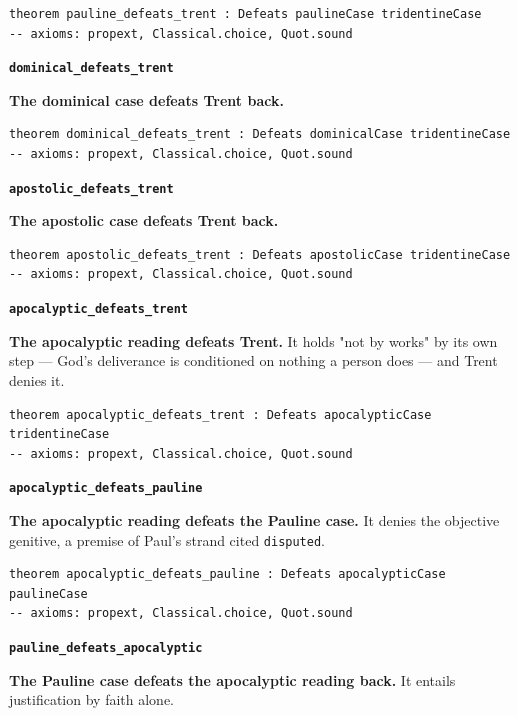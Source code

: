 \documentclass[11pt]{article}
\begin{document}
{\small\begin{verbatim}
theorem pauline_defeats_trent : Defeats paulineCase tridentineCase
-- axioms: propext, Classical.choice, Quot.sound
\end{verbatim}}
\par\medskip\noindent\textbf{\texttt{dominical\_\allowbreak{}defeats\_\allowbreak{}trent}}\par\nobreak\noindent
\textbf{The dominical case defeats Trent back.}

{\small\begin{verbatim}
theorem dominical_defeats_trent : Defeats dominicalCase tridentineCase
-- axioms: propext, Classical.choice, Quot.sound
\end{verbatim}}
\par\medskip\noindent\textbf{\texttt{apostolic\_\allowbreak{}defeats\_\allowbreak{}trent}}\par\nobreak\noindent
\textbf{The apostolic case defeats Trent back.}

{\small\begin{verbatim}
theorem apostolic_defeats_trent : Defeats apostolicCase tridentineCase
-- axioms: propext, Classical.choice, Quot.sound
\end{verbatim}}
\par\medskip\noindent\textbf{\texttt{apocalyptic\_\allowbreak{}defeats\_\allowbreak{}trent}}\par\nobreak\noindent
\textbf{The apocalyptic reading defeats Trent.} It holds "not by works" by its own step — God's deliverance is conditioned on nothing a person does — and Trent denies it.

{\small\begin{verbatim}
theorem apocalyptic_defeats_trent : Defeats apocalypticCase tridentineCase
-- axioms: propext, Classical.choice, Quot.sound
\end{verbatim}}
\par\medskip\noindent\textbf{\texttt{apocalyptic\_\allowbreak{}defeats\_\allowbreak{}pauline}}\par\nobreak\noindent
\textbf{The apocalyptic reading defeats the Pauline case.} It denies the objective genitive, a premise of Paul's strand cited \texttt{disputed}.

{\small\begin{verbatim}
theorem apocalyptic_defeats_pauline : Defeats apocalypticCase paulineCase
-- axioms: propext, Classical.choice, Quot.sound
\end{verbatim}}
\par\medskip\noindent\textbf{\texttt{pauline\_\allowbreak{}defeats\_\allowbreak{}apocalyptic}}\par\nobreak\noindent
\textbf{The Pauline case defeats the apocalyptic reading back.} It entails justification by faith alone.
\end{document}
